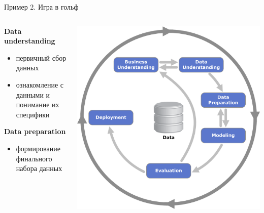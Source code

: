 \documentclass[aspectratio=169]{beamer}
\begin{document}
\begin{frame}{Пример 2. Игра в гольф}

\begin{columns}
    \begin{column}{.7\textwidth}
		{\bf Data understanding}
		\begin{itemize}
		\item первичный сбор данных
		\item ознакомление с данными и понимание их специфики
		\end{itemize}
		
		\vspace{1em}

		{\bf Data preparation}
		\begin{itemize}
		\item формирование финального набора данных
		\end{itemize}
    \end{column}
    \begin{column}{.3\textwidth}
    \vspace{-0em}
		\begin{center}
   		\includegraphics[width=\textwidth]{images/crisp.png}
    \end{center}
    \end{column}
  \end{columns}

\end{frame}
\end{document}
